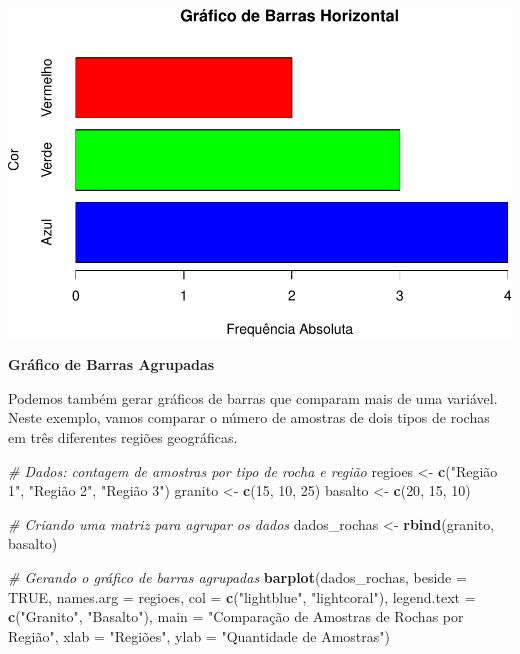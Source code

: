 \documentclass[
]{book}
\newenvironment{Shaded}{\begin{snugshade}}{\end{snugshade}}
\newcommand{\AttributeTok}[1]{\textcolor[rgb]{0.13,0.29,0.53}{#1}}
\newcommand{\CommentTok}[1]{\textcolor[rgb]{0.56,0.35,0.01}{\textit{#1}}}
\newcommand{\ConstantTok}[1]{\textcolor[rgb]{0.56,0.35,0.01}{#1}}
\newcommand{\DecValTok}[1]{\textcolor[rgb]{0.00,0.00,0.81}{#1}}
\newcommand{\FunctionTok}[1]{\textcolor[rgb]{0.13,0.29,0.53}{\textbf{#1}}}
\newcommand{\NormalTok}[1]{#1}
\newcommand{\OtherTok}[1]{\textcolor[rgb]{0.56,0.35,0.01}{#1}}
\newcommand{\StringTok}[1]{\textcolor[rgb]{0.31,0.60,0.02}{#1}}
\begin{document}
\includegraphics{introR_files/figure-latex/unnamed-chunk-164-1.pdf}

\textbf{Gráfico de Barras Agrupadas}

Podemos também gerar gráficos de barras que comparam mais de uma variável. Neste exemplo, vamos comparar o número de amostras de dois tipos de rochas em três diferentes regiões geográficas.

\begin{Shaded}
\begin{Highlighting}[]
\CommentTok{\# Dados: contagem de amostras por tipo de rocha e região}
\NormalTok{regioes }\OtherTok{\textless{}{-}} \FunctionTok{c}\NormalTok{(}\StringTok{"Região 1"}\NormalTok{, }\StringTok{"Região 2"}\NormalTok{, }\StringTok{"Região 3"}\NormalTok{)}
\NormalTok{granito }\OtherTok{\textless{}{-}} \FunctionTok{c}\NormalTok{(}\DecValTok{15}\NormalTok{, }\DecValTok{10}\NormalTok{, }\DecValTok{25}\NormalTok{)}
\NormalTok{basalto }\OtherTok{\textless{}{-}} \FunctionTok{c}\NormalTok{(}\DecValTok{20}\NormalTok{, }\DecValTok{15}\NormalTok{, }\DecValTok{10}\NormalTok{)}

\CommentTok{\# Criando uma matriz para agrupar os dados}
\NormalTok{dados\_rochas }\OtherTok{\textless{}{-}} \FunctionTok{rbind}\NormalTok{(granito, basalto)}

\CommentTok{\# Gerando o gráfico de barras agrupadas}
\FunctionTok{barplot}\NormalTok{(dados\_rochas, }
        \AttributeTok{beside =} \ConstantTok{TRUE}\NormalTok{, }
        \AttributeTok{names.arg =}\NormalTok{ regioes, }
        \AttributeTok{col =} \FunctionTok{c}\NormalTok{(}\StringTok{"lightblue"}\NormalTok{, }\StringTok{"lightcoral"}\NormalTok{), }
        \AttributeTok{legend.text =} \FunctionTok{c}\NormalTok{(}\StringTok{"Granito"}\NormalTok{, }\StringTok{"Basalto"}\NormalTok{),}
        \AttributeTok{main =} \StringTok{"Comparação de Amostras de Rochas por Região"}\NormalTok{, }
        \AttributeTok{xlab =} \StringTok{"Regiões"}\NormalTok{, }
        \AttributeTok{ylab =} \StringTok{"Quantidade de Amostras"}\NormalTok{)}
\end{Highlighting}
\end{Shaded}
\end{document}

